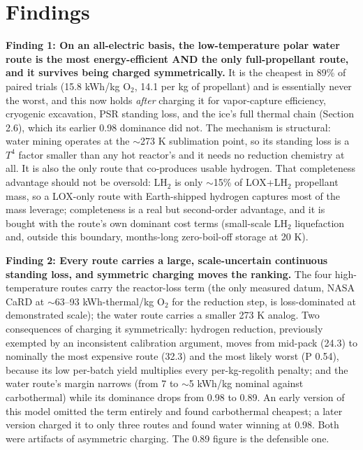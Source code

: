 \documentclass[11pt,a4paper]{article}
\begin{document}
\section{Findings}

\textbf{Finding 1: On an all-electric basis, the low-temperature polar water route is the
most energy-efficient AND the only full-propellant route, and it survives being charged
symmetrically.} It is the cheapest in 89\% of paired trials (15.8 kWh/kg O$_2$, 14.1 per
kg of propellant) and is essentially never the worst, and this now holds \emph{after}
charging it for vapor-capture efficiency, cryogenic excavation, PSR standing loss, and the
ice's full thermal chain (Section 2.6), which its earlier 0.98 dominance did not. The
mechanism is structural: water mining operates at the $\sim$273 K sublimation point, so
its standing loss is a $T^4$ factor smaller than any hot reactor's and it needs no
reduction chemistry at all. It is also the only route that co-produces usable hydrogen.
That completeness advantage should not be oversold: LH$_2$ is only $\sim$15\% of LOX+LH$_2$
propellant mass, so a LOX-only route with Earth-shipped hydrogen captures most of the mass
leverage; completeness is a real but second-order advantage, and it is bought with the
route's own dominant cost terms (small-scale LH$_2$ liquefaction and, outside this
boundary, months-long zero-boil-off storage at 20 K).

\textbf{Finding 2: Every route carries a large, scale-uncertain continuous standing loss,
and symmetric charging moves the ranking.} The four high-temperature routes carry the
reactor-loss term (the only measured datum, NASA CaRD at $\sim$63--93 kWh-thermal/kg O$_2$
for the reduction step, is loss-dominated at demonstrated scale); the water route carries
a smaller 273 K analog. Two consequences of charging it symmetrically: hydrogen reduction,
previously exempted by an inconsistent calibration argument, moves from mid-pack (24.3) to
nominally the most expensive route (32.3) and the most likely worst (P 0.54), because its
low per-batch yield multiplies every per-kg-regolith penalty; and the water route's margin
narrows (from 7 to $\sim$5 kWh/kg nominal against carbothermal) while its dominance drops
from 0.98 to 0.89. An early version of this model omitted the term entirely and found
carbothermal cheapest; a later version charged it to only three routes and found water
winning at 0.98. Both were artifacts of asymmetric charging. The 0.89 figure is the
defensible one.
\end{document}
